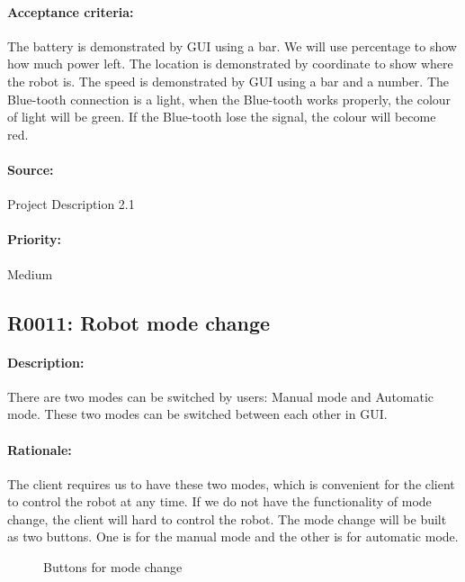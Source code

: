 \documentclass[11pt, a4paper]{report}
\begin{document}
\paragraph{Acceptance criteria:}
The battery is demonstrated by GUI using a bar. We will use percentage to show how much power left. The location is demonstrated by coordinate to show where the robot is. 
The speed is demonstrated by GUI using a bar and a number. 
The Blue-tooth connection is a light, when the Blue-tooth works properly, the colour of  light will be green. If the Blue-tooth lose the signal, the colour will become red.
\paragraph{Source:}
 Project Description 2.1
\paragraph{Priority:}
Medium



\subsection{R0011: Robot mode change}
\paragraph{Description:}
There are two modes can be switched by users: Manual mode and Automatic mode. These two modes can be switched between each other in GUI. 
\paragraph{Rationale:}
The client requires us to have these two modes, which is convenient for the client to control the robot at any time. If we do not have the functionality of mode change, the client will hard to control the robot. The mode change will be built as two buttons. One is for the manual mode and the other is for automatic mode.





\begin{figure}[ht]
\centering
\setlength\fboxsep{2pt}
\setlength\fboxrule{0.2pt}
\caption{Buttons for mode change}
\label{sec:NXJCC}
\label{fig:NXJCC}
\end{figure}
\end{document}
